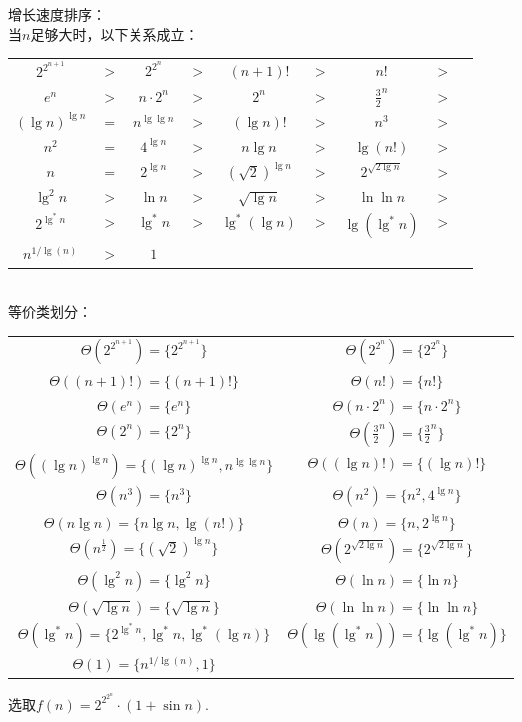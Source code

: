 
\begin{solution}
    增长速度排序：\\
    当$n$足够大时，以下关系成立：\\
    \begin{tabular}{ccccccccc}
        $2^{2^{n+1}}$       &$>$& $2^{2^n}$         &$>$& $(n+1)!$              &$>$& $n!$                  &$>$\\
        $e^n$               &$>$& $n \cdot 2^n$     &$>$& $2^n$                 &$>$& $\frac{3}{2}^{n}$     &$>$\\
        $(\lg n)^{\lg n}$   &$=$& $n^{\lg\lg n}$    &$>$& $(\lg n)!$            &$>$& $n^3$                 &$>$\\
        $n^2$               &$=$& $4^{\lg n}$       &$>$& $n\lg n$              &$>$& $\lg (n!)$            &$>$\\
        $n$                 &$=$& $2^{\lg n}$       &$>$& $(\sqrt{2})^{\lg n}$  &$>$& $2^{\sqrt{2\lg n}}$   &$>$\\
        $\lg^2 n$           &$>$& $\ln n$           &$>$& $\sqrt{\lg n}$        &$>$& $\ln\ln n$            &$>$\\
        $2^{\lg^* n}$       &$>$& $\lg^* n$         &$>$& $\lg^*(\lg n)$        &$>$& $\lg(\lg^* n)$        &$>$\\         
        $n^{1/\lg(n)}$      &$>$& $1$
    \end{tabular}\\
    等价类划分：\\
    \begin{longtable}{cc}
    $\Theta(2^{2^{n+1}}) = \{2^{2^{n+1}}\}$ &
    $\Theta(2^{2^n}) = \{2^{2^n}\}$\\
    $\Theta((n+1)!) = \{(n+1)!\}$&
    $\Theta(n!) = \{n!\}$\\
    $\Theta(e^n) = \{e^n\}$&
    $\Theta(n \cdot 2^n) = \{n \cdot 2^n\}$\\
    $\Theta(2^n) = \{2^n\}$&
    $\Theta(\frac{3}{2}^{n}) = \{\frac{3}{2}^{n}\}$\\
    $\Theta((\lg n)^{\lg n}) = \{(\lg n)^{\lg n}, n^{\lg\lg n}\}$&
    $\Theta((\lg n)!) = \{(\lg n)!\}$\\

    $\Theta(n^3) = \{n^3\}$&
    $\Theta(n^2) = \{n^2, 4^{\lg n}\}$\\
    $\Theta(n\lg n) = \{n\lg n, \lg (n!)\}$&
    $\Theta(n) = \{n, 2^{\lg n}\}$\\
    $\Theta(n^{\frac{1}{2}}) = \{(\sqrt{2})^{\lg n}\}$&
    $\Theta(2^{\sqrt{2\lg n}}) = \{2^{\sqrt{2\lg n}}\}$\\

    $\Theta(\lg^2 n) = \{\lg^2 n\}$&
    $\Theta(\ln n) = \{\ln n\}$\\
    $\Theta(\sqrt{\lg n}) = \{\sqrt{\lg n}\}$&
    $\Theta(\ln\ln n) = \{\ln\ln n\}$\\

    $\Theta(\lg^* n) = \{2^{\lg^* n}, \lg^* n, \lg^*(\lg n)\}$&
    $\Theta(\lg(\lg^* n)) = \{\lg(\lg^* n)\}$\\
    $\Theta(1) = \{n^{1/\lg(n)}, 1\}$\\
    \end{longtable}
    选取$f(n) = 2^{2^{2^n}} \cdot (1+\sin n)$.
\end{solution}